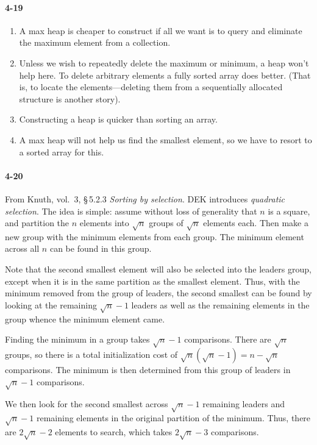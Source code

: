 \documentclass{report}
\begin{document}
\paragraph{4-19}
\begin{enumerate}[label=(\alph*)]
	\item A max heap is cheaper to construct if all we want is to query and eliminate the maximum element from a collection.
	\item Unless we wish to repeatedly delete the maximum or minimum, a heap won't help here. To delete arbitrary elements a fully sorted array does better. (That is, to locate the elements---deleting them from a sequentially allocated structure is another story).
	\item Constructing a heap is quicker than sorting an array.
	\item A max heap will not help us find the smallest element, so we have to resort to a sorted array for this.
\end{enumerate}

\paragraph{4-20} From Knuth, vol.\ 3, \S\,5.2.3 {\sl Sorting by selection\/}. DEK introduces \emph{quadratic selection}. The idea is simple: assume without loss of generality that $n$ is a square, and partition the $n$ elements into $\sqrt{n}$ groups of $\sqrt{n}$ elements each. Then make a new group with the minimum elements from each group. The minimum element across all $n$ can be found in this group.

Note that the second smallest element will also be selected into the leaders group, except when it is in the same partition as the smallest element. Thus, with the minimum removed from the group of leaders, the second smallest can be found by looking at the remaining $\sqrt{n}-1$ leaders as well as the remaining elements in the group whence the minimum element came.

\medskip

Finding the minimum in a group takes $\sqrt{n}-1$ comparisons. There are $\sqrt{n}$ groups, so there is a total initialization cost of $\sqrt{n}(\sqrt{n}-1) = n - \sqrt{n}$ comparisons. The minimum is then determined from this group of leaders in $\sqrt{n}-1$ comparisons.

We then look for the second smallest across $\sqrt{n}-1$ remaining leaders and $\sqrt{n}-1$ remaining elements in the original partition of the minimum. Thus, there are $2\sqrt{n}-2$ elements to search, which takes $2\sqrt{n}-3$ comparisons.
\end{document}

